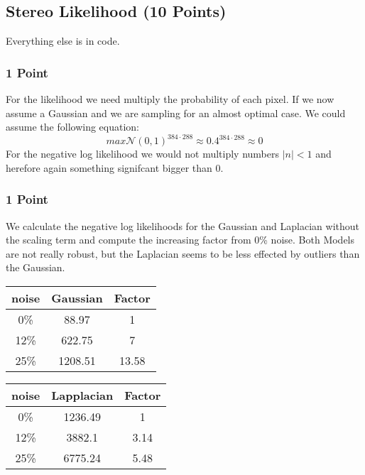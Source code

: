 \newif\ifvimbug
\vimbugfalse

\ifvimbug

\fi


\subsection{Stereo Likelihood (10 Points)}
\setcounter{subsubsection}{2}
Everything else is in code.
\subsubsection{1 Point}
For the likelihood we need multiply the probability of each pixel. If we now assume a Gaussian and we are sampling
for an almost optimal case. We could assume the following equation:
$$max\mathcal{N}(0, 1)^{384\cdot288} \approx 0.4^{384\cdot288} \approx  0$$
For the negative log likelihood we would not multiply numbers $|n|<1$ and herefore again something signifcant bigger than 0.
\setcounter{subsubsection}{5}
\subsubsection{1 Point}
We calculate the negative log likelihoods for the Gaussian and Laplacian without the scaling term  and compute the increasing factor from 0\% noise. Both Models are not really robust, but the Laplacian seems to be less effected by outliers than the Gaussian.\\
\begin{tabular}{|c|c|c|}
\hline
noise & Gaussian & Factor\\\hline
0\% & 88.97 & 1\\\hline
12\% &  622.75 & 7\\\hline
25\% & 1208.51 & 13.58\\\hline
\end{tabular}
\begin{tabular}{|c|c|c|}
\hline
noise & Lapplacian & Factor\\\hline
0\% & 1236.49 & 1\\\hline
12\% &  3882.1 & 3.14\\\hline
25\% & 6775.24 & 5.48\\\hline
\end{tabular}